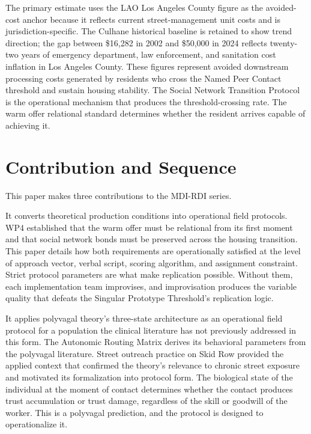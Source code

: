 \documentclass[12pt, letterpaper]{article}
\begin{document}
The primary estimate uses the LAO Los Angeles County figure as the avoided-cost anchor because it reflects current street-management unit costs and is jurisdiction-specific. The Culhane historical baseline is retained to show trend direction; the gap between \$16,282 in 2002 and \$50,000 in 2024 reflects twenty-two years of emergency department, law enforcement, and sanitation cost inflation in Los Angeles County. These figures represent avoided downstream processing costs generated by residents who cross the Named Peer Contact threshold and sustain housing stability. The Social Network Transition Protocol is the operational mechanism that produces the threshold-crossing rate. The warm offer relational standard determines whether the resident arrives capable of achieving it.




\clearpage
\section{Contribution and Sequence}

This paper makes three contributions to the MDI-RDI series.

It converts theoretical production conditions into operational field protocols. WP4 established that the warm offer must be relational from its first moment and that social network bonds must be preserved across the housing transition. This paper details how both requirements are operationally satisfied at the level of approach vector, verbal script, scoring algorithm, and assignment constraint. Strict protocol parameters are what make replication possible. Without them, each implementation team improvises, and improvisation produces the variable quality that defeats the Singular Prototype Threshold's replication logic.

It applies polyvagal theory's three-state architecture as an operational field protocol for a population the clinical literature has not previously addressed in this form. The Autonomic Routing Matrix derives its behavioral parameters from the polyvagal literature. Street outreach practice on Skid Row provided the applied context that confirmed the theory's relevance to chronic street exposure and motivated its formalization into protocol form. The biological state of the individual at the moment of contact determines whether the contact produces trust accumulation or trust damage, regardless of the skill or goodwill of the worker. This is a polyvagal prediction, and the protocol is designed to operationalize it.
\end{document}
